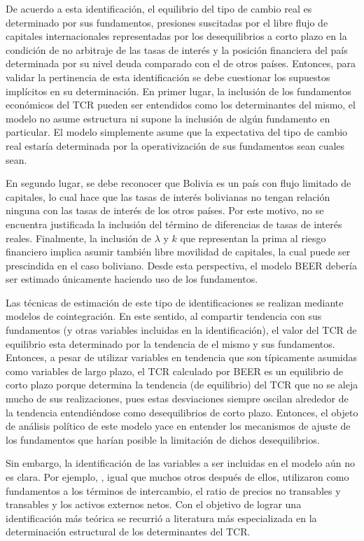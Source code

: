 \documentclass[12pt,letterpaper]{article}
\begin{document}
De acuerdo a esta identificación, el equilibrio del tipo de cambio real es determinado por sus fundamentos, presiones suscitadas por el libre flujo de capitales internacionales representadas por los desequilibrios a corto plazo en la condición de no arbitraje de las tasas de interés y la posición financiera del país determinada por su nivel deuda comparado con el de otros países. Entonces, para validar la pertinencia de esta identificación se debe cuestionar los supuestos implícitos en su determinación. En primer lugar, la inclusión de los fundamentos económicos del TCR pueden ser entendidos como los determinantes del mismo, el modelo no asume estructura ni supone la inclusión de algún fundamento en particular. El modelo simplemente asume que la expectativa del tipo de cambio real estaría determinada por la operativización de sus fundamentos sean cuales sean. 

En segundo lugar, se debe reconocer que Bolivia es un país con flujo limitado de capitales, lo cual hace que las tasas de interés bolivianas no tengan relación ninguna con las tasas de interés de los otros países. Por este motivo, no se encuentra justificada la inclusión del término de diferencias de tasas de interés reales. Finalmente, la inclusión de $\lambda$ y $k$ que representan la prima al riesgo financiero implica asumir también libre movilidad de capitales, la cual puede ser prescindida en el caso boliviano. Desde esta perspectiva, el modelo BEER debería ser estimado únicamente haciendo uso de los fundamentos. 

Las técnicas de estimación de este tipo de identificaciones se realizan mediante modelos de cointegración. En este sentido, al compartir tendencia con sus fundamentos (y otras variables incluidas en la identificación), el valor del TCR  de equilibrio esta determinado por la tendencia de el mismo y sus fundamentos. Entonces, a pesar de utilizar variables en tendencia que son típicamente asumidas como variables de largo plazo, el TCR calculado por BEER es un equilibrio de corto plazo porque determina la tendencia (de equilibrio) del TCR que no se aleja mucho de sus realizaciones, pues estas desviaciones siempre oscilan alrededor de la tendencia entendiéndose como desequilibrios de corto plazo. Entonces, el objeto de análisis político de este modelo yace en entender los mecanismos de ajuste de los fundamentos que harían posible la limitación de dichos desequilibrios.

Sin embargo, la identificación de las variables a ser incluidas en el modelo aún no es clara. Por ejemplo, \cite{clark1999exchange}, igual que muchos otros después de ellos, utilizaron como fundamentos a los términos de intercambio, el ratio de precios no transables y transables y los activos externos netos. Con el objetivo de lograr una identificación más teórica se recurrió a literatura más especializada en la determinación estructural de los determinantes del TCR.
\end{document}
